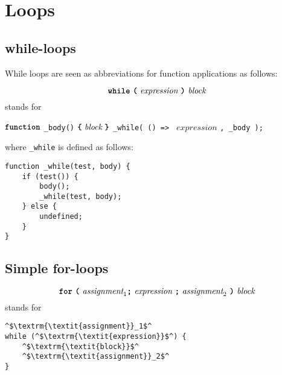 \section*{Loops}

\subsection*{\hypertarget{while}{while-loops}}

While loops are seen as abbreviations for function applications as follows:

\[
\textbf{\texttt{while}}\ \textbf{\texttt{(}}\  \textit{expression} \ \textbf{\texttt{)}} \
\textit{block}
\]
stands for

\begin{center}
  \begin{minipage}{90mm}
$\textbf{\texttt{function}}$ \lstinline{_body()} $\textbf{\texttt{\{}}\  \textit{block} \ \textbf{\texttt{\}}}$\newline
\lstinline{_while( () => } $\textit{expression}$ \lstinline{, _body );}
  \end{minipage}
\end{center}

where \lstinline{_while} is defined as follows:

\begin{lstlisting}
function _while(test, body) {
    if (test()) {
        body(); 
        _while(test, body); 
    } else { 
        undefined; 
    }
}
\end{lstlisting}

\subsection*{\hypertarget{for}{Simple for-loops}}

\[\textbf{\texttt{for}}\ \textbf{\texttt{(}} \ 
                                          \textit{assignment}_1 \textbf{\texttt{;}} 
\ \textit{expression} \ \textbf{\texttt{;}} \ \textit{assignment}_2 \ \textbf{\texttt{)}} \ 
                                            \textit{block}
\]
stands for
\begin{center}
  \begin{minipage}{90mm}
\begin{lstlisting}
^$\textrm{\textit{assignment}}_1$^  
while (^$\textrm{\textit{expression}}$^) {
    ^$\textrm{\textit{block}}$^
    ^$\textrm{\textit{assignment}}_2$^
}
\end{lstlisting}
  \end{minipage}
\end{center}

